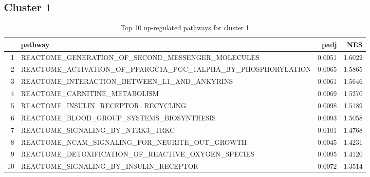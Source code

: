 \documentclass{article}
\begin{document}
\subsection{Cluster 1 }
\begin{table}[H]
\centering
\begin{tabularx}{\textwidth}{rlrr}
  \hline
 & pathway & padj & NES \\ 
  \hline
1 & REACTOME\_GENERATION\_OF\_SECOND\_MESSENGER\_MOLECULES & 0.0051 & 1.6022 \\ 
  2 & REACTOME\_ACTIVATION\_OF\_PPARGC1A\_PGC\_1ALPHA\_BY\_PHOSPHORYLATION & 0.0065 & 1.5865 \\ 
  3 & REACTOME\_INTERACTION\_BETWEEN\_L1\_AND\_ANKYRINS & 0.0061 & 1.5646 \\ 
  4 & REACTOME\_CARNITINE\_METABOLISM & 0.0069 & 1.5270 \\ 
  5 & REACTOME\_INSULIN\_RECEPTOR\_RECYCLING & 0.0098 & 1.5189 \\ 
  6 & REACTOME\_BLOOD\_GROUP\_SYSTEMS\_BIOSYNTHESIS & 0.0093 & 1.5058 \\ 
  7 & REACTOME\_SIGNALING\_BY\_NTRK3\_TRKC & 0.0101 & 1.4768 \\ 
  8 & REACTOME\_NCAM\_SIGNALING\_FOR\_NEURITE\_OUT\_GROWTH & 0.0045 & 1.4231 \\ 
  9 & REACTOME\_DETOXIFICATION\_OF\_REACTIVE\_OXYGEN\_SPECIES & 0.0095 & 1.4120 \\ 
  10 & REACTOME\_SIGNALING\_BY\_INSULIN\_RECEPTOR & 0.0072 & 1.3514 \\ 
   \hline
\end{tabularx}
\caption{Top 10 up-regulated pathways for cluster 1} 
\label{tab:q3_2_1}
\end{table}
\end{document}
